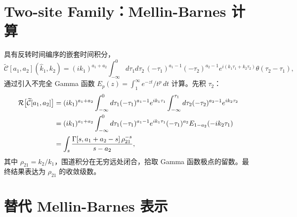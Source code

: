 ﻿\documentclass[a4paper,11pt]{article}
\begin{document}
\section{Two-site Family：Mellin-Barnes 计算}

具有反转时间编序的嵌套时间积分，
\begin{equation}
    \widetilde{\mathcal{C}}[a_1,a_2](\widehat k_1,k_2)=(ik_1)^{a_1+a_2}
    \int_{-\infty}^0d\tau_1d\tau_2\,(-\tau_1)^{a_1-1}(-\tau_2)^{a_2-1}
    e^{i(k_1\tau_1+k_2\tau_2)}\theta(\tau_2-\tau_1),
\end{equation}
通过引入不完全 Gamma 函数 $E_p(z)=\int_1^\infty e^{-zt}/t^p\,dt$ 计算。先积 $\tau_2$：
\begin{align}
    \mathcal{R}\bigl[\widetilde{\mathcal{C}}[a_1,a_2]\bigr]
    &=(ik_1)^{a_1+a_2}\int_{-\infty}^0d\tau_1(-\tau_1)^{a_1-1}e^{ik_1\tau_1}
      \int_{-\infty}^{\tau_1}d\tau_2(-\tau_2)^{a_2-1}e^{ik_2\tau_2}\notag\\
    &=(ik_1)^{a_1+a_2}\int_{-\infty}^0d\tau_1(-\tau_1)^{a_1-1}e^{ik_1\tau_1}
      (-\tau_1)^{a_2}E_{1-a_2}(-ik_2\tau_1)\notag\\
    &=\int_s\frac{\Gamma[s,a_1+a_2-s]\,\rho_{21}^{-s}}{s-a_2},
\end{align}
其中 $\rho_{21}=k_2/k_1$，围道积分在无穷远处闭合，拾取 Gamma 函数极点的留数。最终结果表达为 $\rho_{21}$ 的收敛级数。

\section{替代 Mellin-Barnes 表示}
\end{document}
